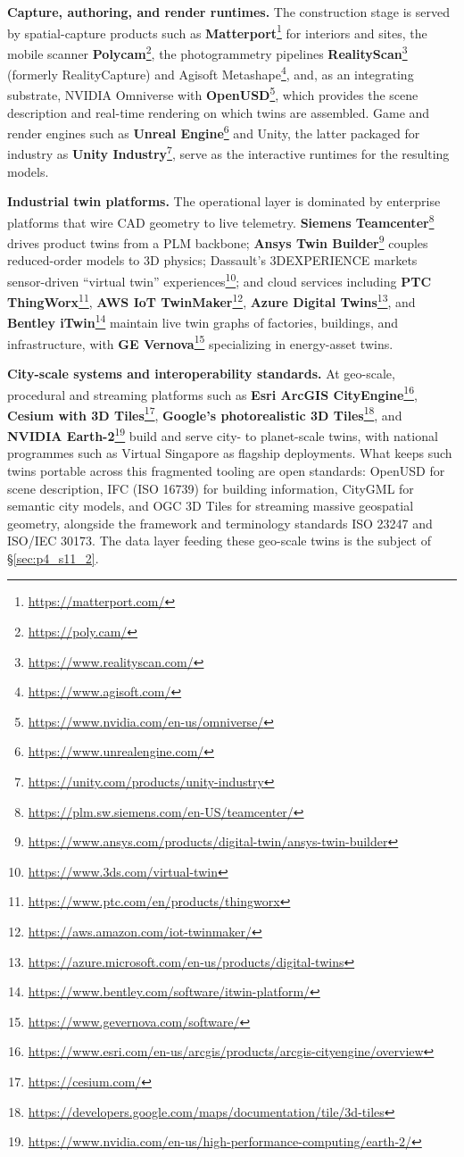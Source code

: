 \textbf{Capture, authoring, and render runtimes.} The construction stage is served by spatial-capture products such as \textbf{Matterport}\footnote{\url{https://matterport.com/}} for interiors and sites, the mobile scanner \textbf{Polycam}\footnote{\url{https://poly.cam/}}, the photogrammetry pipelines \textbf{RealityScan}\footnote{\url{https://www.realityscan.com/}} (formerly RealityCapture) and Agisoft Metashape\footnote{\url{https://www.agisoft.com/}}, and, as an integrating substrate, NVIDIA Omniverse with \textbf{OpenUSD}\footnote{\url{https://www.nvidia.com/en-us/omniverse/}}, which provides the scene description and real-time rendering on which twins are assembled. Game and render engines such as \textbf{Unreal Engine}\footnote{\url{https://www.unrealengine.com/}} and Unity, the latter packaged for industry as \textbf{Unity Industry}\footnote{\url{https://unity.com/products/unity-industry}}, serve as the interactive runtimes for the resulting models.

\textbf{Industrial twin platforms.} The operational layer is dominated by enterprise platforms that wire CAD geometry to live telemetry. \textbf{Siemens Teamcenter}\footnote{\url{https://plm.sw.siemens.com/en-US/teamcenter/}} drives product twins from a PLM backbone; \textbf{Ansys Twin Builder}\footnote{\url{https://www.ansys.com/products/digital-twin/ansys-twin-builder}} couples reduced-order models to 3D physics; Dassault's 3DEXPERIENCE markets sensor-driven ``virtual twin'' experiences\footnote{\url{https://www.3ds.com/virtual-twin}}; and cloud services including \textbf{PTC ThingWorx}\footnote{\url{https://www.ptc.com/en/products/thingworx}}, \textbf{AWS IoT TwinMaker}\footnote{\url{https://aws.amazon.com/iot-twinmaker/}}, \textbf{Azure Digital Twins}\footnote{\url{https://azure.microsoft.com/en-us/products/digital-twins}}, and \textbf{Bentley iTwin}\footnote{\url{https://www.bentley.com/software/itwin-platform/}} maintain live twin graphs of factories, buildings, and infrastructure, with \textbf{GE Vernova}\footnote{\url{https://www.gevernova.com/software/}} specializing in energy-asset twins.

\textbf{City-scale systems and interoperability standards.} At geo-scale, procedural and streaming platforms such as \textbf{Esri ArcGIS CityEngine}\footnote{\url{https://www.esri.com/en-us/arcgis/products/arcgis-cityengine/overview}}, \textbf{Cesium with 3D Tiles}\footnote{\url{https://cesium.com/}}, \textbf{Google's photorealistic 3D Tiles}\footnote{\url{https://developers.google.com/maps/documentation/tile/3d-tiles}}, and \textbf{NVIDIA Earth-2}\footnote{\url{https://www.nvidia.com/en-us/high-performance-computing/earth-2/}} build and serve city- to planet-scale twins, with national programmes such as Virtual Singapore as flagship deployments. What keeps such twins portable across this fragmented tooling are open standards: OpenUSD for scene description, IFC (ISO 16739) for building information, CityGML for semantic city models, and OGC 3D Tiles for streaming massive geospatial geometry, alongside the framework and terminology standards ISO 23247 and ISO/IEC 30173. The data layer feeding these geo-scale twins is the subject of §\ref{sec:p4_s11_2}.

